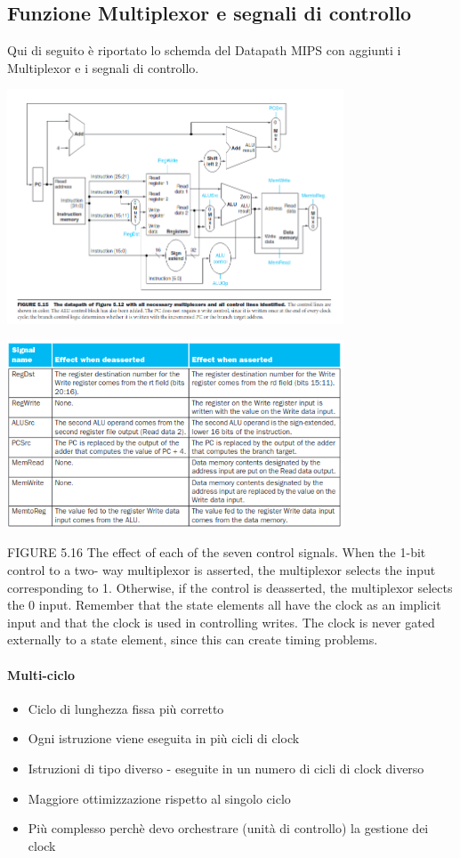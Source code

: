 \documentclass[12pt, a4paper, openany]{book}
\begin{document}
\subsection*{Funzione Multiplexor e segnali di controllo}
Qui di seguito è riportato lo schemda del Datapath MIPS con aggiunti i Multiplexor e i
segnali di controllo.
\begin{center}
    \includegraphics[width=100mm, scale=0.5]{ALU control signal scheme.png}
\end{center}
\begin{center}
    \includegraphics[width=100mm, scale=0.5]{Multiplexor ALU signal control.png}
\end{center}
FIGURE 5.16 The effect of each of the seven control signals. When the 1-bit control to a two-
way multiplexor is asserted, the multiplexor selects the input corresponding to 1. Otherwise, if the control is
deasserted, the multiplexor selects the 0 input. Remember that the state elements all have the clock as an
implicit input and that the clock is used in controlling writes. The clock is never gated externally to a state
element, since this can create timing problems.


\paragraph*{Multi-ciclo} \begin{itemize}
    \item Ciclo di lunghezza fissa più corretto
    \item Ogni istruzione viene eseguita in più cicli di clock
    \item Istruzioni di tipo diverso - eseguite in un numero di cicli di clock diverso
    \item Maggiore ottimizzazione rispetto al singolo ciclo
    \item Più complesso perchè devo orchestrare (unità di controllo) la gestione dei clock
\end{itemize}
\end{document}

